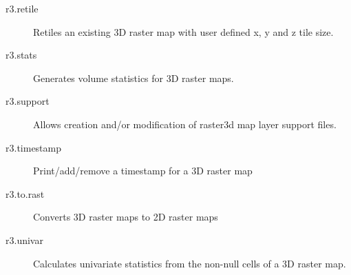 \begin{description}
\item [{r3.retile}] Retiles an existing 3D raster map with user defined
x, y and z tile size.
\item [{r3.stats}] Generates volume statistics for 3D raster maps.
\item [{r3.support}] Allows creation and/or modification of raster3d map
layer support files.
\item [{r3.timestamp}] Print/add/remove a timestamp for a 3D raster map
\item [{r3.to.rast}] Converts 3D raster maps to 2D raster maps
\item [{r3.univar}] Calculates univariate statistics from the non-null
cells of a 3D raster map.\end{description}

